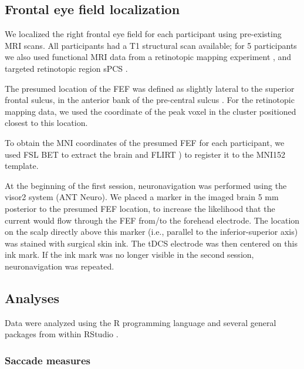\documentclass[11pt,]{memoir}
\begin{document}
\hypertarget{frontal-eye-field-localization}{%
\subsection{Frontal eye field localization}\label{frontal-eye-field-localization}}

We localized the right frontal eye field for each participant using pre-existing MRI scans. All participants had a T1 structural scan available; for 5 participants we also used functional MRI data from a retinotopic mapping experiment \autocite{VanEs2017}, and targeted retinotopic region sPCS \autocite{Mackey2017}.

The presumed location of the FEF was defined as slightly lateral to the superior frontal sulcus, in the anterior bank of the pre-central sulcus \autocites{Amiez2009}{Blanke2000}{Vernet2014}{Mackey2017}. For the retinotopic mapping data, we used the coordinate of the peak voxel in the cluster positioned closest to this location.

To obtain the MNI coordinates of the presumed FEF for each participant, we used FSL \autocites{Jenkinson2012}{Smith2004} BET \autocite{Smith2002} to extract the brain and FLIRT \autocites{Jenkinson2002}{Jenkinson2001}) to register it to the MNI152 template.

At the beginning of the first session, neuronavigation was performed using the visor2 system (ANT Neuro). We placed a marker in the imaged brain 5 mm posterior to the presumed FEF location, to increase the likelihood that the current would flow through the FEF from/to the forehead electrode. The location on the scalp directly above this marker (i.e., parallel to the inferior-superior axis) was stained with surgical skin ink. The tDCS electrode was then centered on this ink mark. If the ink mark was no longer visible in the second session, neuronavigation was repeated.

\hypertarget{analyses}{%
\subsection{Analyses}\label{analyses}}

Data were analyzed using the R programming language \autocite{R-base} and several general packages \autocites{Wickham2017}{R-tidyverse}{R-broom}{R-cowplot} from within RStudio \autocite{RStudio2016}.

\hypertarget{saccade-measures}{%
\subsubsection{Saccade measures}\label{saccade-measures}}
\end{document}
